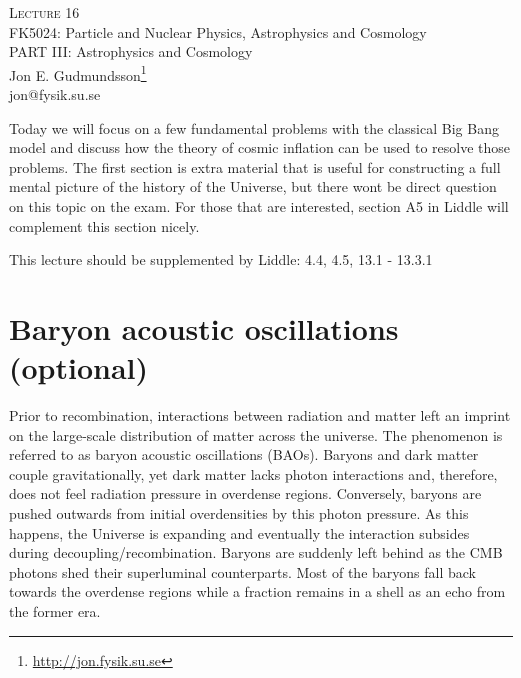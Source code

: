 \documentclass[a4paper,12pt]{article}
\theoremstyle{remark}
\renewcommand{\=}[1]{\stackrel{#1}{=}} %
\newcommand{\linkc}[1]{\textcolor{linkc}{#1}}
\theoremstyle{plain}
\theoremstyle{definition}
\begin{document}
\fontsize{5mm}{6mm}\selectfont\thispagestyle{empty}

\thispagestyle{empty}
\begin{center}
\textsc{Lecture 16}\\[1.5ex]
{\Huge FK5024: Particle and Nuclear Physics, Astrophysics and Cosmology\\}
\vspace{3mm}
{\large PART III: Astrophysics and Cosmology \\}
Jon E. Gudmundsson\footnote{\href{http://jon.fysik.su.se}{\linkc{http://jon.fysik.su.se}}} \\
\linkc{jon@fysik.su.se}
\end{center}
Today we will focus on a few fundamental problems with the classical Big Bang model and discuss how the theory of cosmic inflation can be used to resolve those problems. The first section is extra material that is useful for constructing a full mental picture of the history of the Universe, but there wont be direct question on this topic on the exam. For those that are interested, section A5 in Liddle will complement this section nicely.
\begin{attention}
This lecture should be supplemented by Liddle: 4.4, 4.5, 13.1 - 13.3.1
\end{attention}

\section{Baryon acoustic oscillations (optional)}
Prior to recombination, interactions between radiation and matter left an imprint on the large-scale distribution of matter across the universe. The phenomenon is referred to as baryon acoustic oscillations (BAOs). Baryons and dark matter couple gravitationally, yet dark matter lacks photon interactions and, therefore, does not feel radiation pressure in overdense regions. Conversely, baryons are pushed outwards from initial overdensities by this photon pressure. As this happens, the Universe is expanding and eventually the interaction subsides during decoupling/recombination. Baryons are suddenly left behind as the CMB photons shed their superluminal counterparts. Most of the baryons fall back towards the overdense regions while a fraction remains in a shell as an echo from the former era. 
\end{document}
